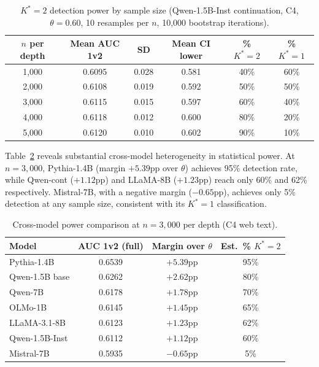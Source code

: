 \documentclass[11pt,a4paper]{article}
\begin{document}
\begin{table}[t]
\centering
\caption{$K^*=2$ detection power by sample size (Qwen-1.5B-Inst continuation, C4, $\theta = 0.60$, 10 resamples per $n$, 10{,}000 bootstrap iterations).}
\label{tab:power_curve}
\small
\begin{tabular}{@{}cccccc@{}}
\toprule
$n$ per depth & Mean AUC 1v2 & SD & Mean CI lower & \% $K^*{=}2$ & \% $K^*{=}1$ \\
\midrule
1,000 & 0.6095 & 0.028 & 0.581 & 40\% & 60\% \\
2,000 & 0.6108 & 0.019 & 0.592 & 50\% & 50\% \\
3,000 & 0.6115 & 0.015 & 0.597 & 60\% & 40\% \\
4,000 & 0.6118 & 0.012 & 0.600 & 80\% & 20\% \\
5,000 & 0.6120 & 0.010 & 0.602 & 90\% & 10\% \\
\bottomrule
\end{tabular}
\end{table}

Table~\ref{tab:power_models} reveals substantial cross-model heterogeneity in statistical power.
At $n = 3{,}000$, Pythia-1.4B (margin $+5.39$pp over $\theta$) achieves 95\% detection rate, while Qwen-cont ($+1.12$pp) and LLaMA-8B ($+1.23$pp) reach only 60\% and 62\% respectively.
Mistral-7B, with a negative margin ($-0.65$pp), achieves only 5\% detection at any sample size, consistent with its $K^* = 1$ classification.

\begin{table}[t]
\centering
\caption{Cross-model power comparison at $n = 3{,}000$ per depth (C4 web text).}
\label{tab:power_models}
\small
\begin{tabular}{@{}lccc@{}}
\toprule
Model & AUC 1v2 (full) & Margin over $\theta$ & Est.\ \% $K^*{=}2$ \\
\midrule
Pythia-1.4B     & 0.6539 & $+5.39$pp & 95\% \\
Qwen-1.5B base  & 0.6262 & $+2.62$pp & 80\% \\
Qwen-7B         & 0.6178 & $+1.78$pp & 70\% \\
OLMo-1B         & 0.6145 & $+1.45$pp & 65\% \\
LLaMA-3.1-8B    & 0.6123 & $+1.23$pp & 62\% \\
Qwen-1.5B-Inst  & 0.6112 & $+1.12$pp & 60\% \\
Mistral-7B      & 0.5935 & $-0.65$pp & 5\%  \\
\bottomrule
\end{tabular}
\end{table}
\end{document}
